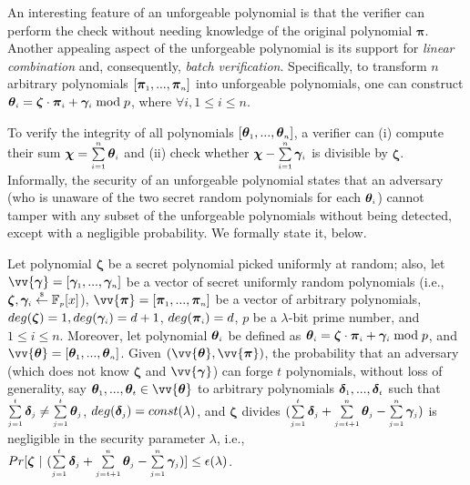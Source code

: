  An interesting feature of an unforgeable polynomial is that the verifier can perform the check without needing knowledge of the original polynomial $\bm\pi$. Another appealing aspect of the unforgeable polynomial is its  support for \emph{linear combination} and, consequently, \emph{batch verification}. Specifically, to transform $n$ arbitrary polynomials $[\bm\pi_{\scriptscriptstyle 1},..., \bm\pi_{\scriptscriptstyle n}]$ into unforgeable polynomials, one can construct  $\bm\theta_{\scriptscriptstyle i}=\bm\zeta\cdot \bm\pi_{\scriptscriptstyle i}+ \bm\gamma_{\scriptscriptstyle i} \bmod p$, where $\forall i, 1\leq i\leq n$.  
 
 
To verify the integrity of all polynomials $[\bm\theta_{\scriptscriptstyle 1},..., \bm\theta_{\scriptscriptstyle n}]$, a verifier can (i) compute their sum $\bm \chi=\sum\limits_{\scriptscriptstyle i=1}^{\scriptscriptstyle n}\bm\theta_{\scriptscriptstyle i}$ and (ii) check whether $\bm \chi- \sum\limits_{\scriptscriptstyle i=1}^{\scriptscriptstyle n}\bm\gamma_{\scriptscriptstyle i} $ is divisible by $\bm \zeta$.  Informally, the security of an unforgeable polynomial states that an adversary (who is unaware of the two secret random polynomials for each $\bm\theta_{\scriptscriptstyle i}$) cannot tamper with any subset of the unforgeable polynomials without being detected, except with a negligible probability. We formally state it, below. 
 
 
\vspace{-1mm}
\begin{theorem}\label{Unforgeable-Polynomials-Linear-Combination}
%
 Let polynomial $\bm\zeta$ be a secret polynomial picked uniformly at random; also, let   $\vv{\bm\gamma}=[\bm\gamma_{\st 1},..., \bm\gamma_{\st n}]$ be a vector of secret uniformly random polynomials (i.e., ${\bm\zeta}, \bm\gamma_{\scriptscriptstyle i} \stackrel{\scriptscriptstyle\$}\leftarrow \mathbb F_{\scriptscriptstyle p}[x]$),  $\vv{\bm\pi}=[\bm\pi_{\st 1},..., \bm\pi_{\st n}]$ be a vector of arbitrary polynomials,   $deg(\bm\zeta)= 1,  deg(\bm\gamma_{\scriptscriptstyle i})= d+1$,  $deg(\bm\pi_{\scriptscriptstyle i})=d$,  $p$ be a $\lambda$-bit prime number, and $1\leq i \leq n$. Moreover, let polynomial $\bm\theta_{\scriptscriptstyle i}$ be defined as  $\bm\theta_{\scriptscriptstyle i}=\bm\zeta\cdot  \bm\pi_{\scriptscriptstyle i}+ \bm\gamma_{\scriptscriptstyle i} \bmod p$, and $\vv{\bm\theta} = [\bm\theta_{\st 1},..., \bm\theta_{\st n}]$.  Given $(\vv{\bm\theta}, \vv{\bm\pi})$, the probability that an adversary (which does not know $\bm\zeta$ and $\vv{\bm\gamma}$) can forge $t$ polynomials, without loss of generality, say $\bm\theta_{\st 1},..., \bm\theta_{\st t} \in \vv{\bm\theta}$ to arbitrary polynomials $\bm\delta_{\scriptscriptstyle 1},..., \bm\delta_{\scriptscriptstyle t}$ such that   $\sum\limits_{\scriptscriptstyle j=1}^{\scriptscriptstyle t}\bm\delta_{\scriptscriptstyle j}\neq \sum\limits_{\scriptscriptstyle j=1}^{\scriptscriptstyle t}\bm\theta_{\scriptscriptstyle j}$, $deg(\bm\delta_{\scriptscriptstyle j})= const(\lambda)$, and $\bm\zeta$ divides $(\sum\limits_{\scriptscriptstyle j=1}^{\scriptscriptstyle t}\bm\delta_{\scriptscriptstyle j} + \sum\limits_{\scriptscriptstyle j=t+1}^{\scriptscriptstyle n}\bm\theta_{\scriptscriptstyle j} - \sum\limits_{\scriptscriptstyle j=1}^{\scriptscriptstyle n}\bm\gamma_{\scriptscriptstyle j} )$ is negligible in the security parameter $\lambda$, i.e.,  
%
$Pr[ \bm\zeta \ | \ (\sum\limits_{\scriptscriptstyle j=1}^{\scriptscriptstyle t}\bm\delta_{\scriptscriptstyle j} + \sum\limits_{\scriptscriptstyle j=t+1}^{\scriptscriptstyle n}\bm\theta_{\scriptscriptstyle j} - \sum\limits_{\scriptscriptstyle j=1}^{\scriptscriptstyle n}\bm\gamma_{\scriptscriptstyle j} ) ]\leq \epsilon(\lambda)$. 

\end{theorem}




